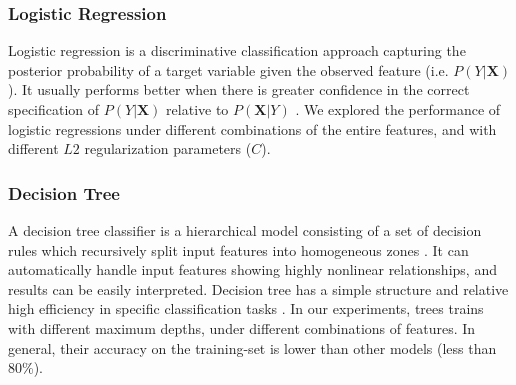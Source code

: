 \documentclass[twoside,twocolumn]{article}
\begin{document}
\subsubsection{Logistic Regression}
Logistic regression is a discriminative classification approach capturing the posterior probability of a target variable given the observed feature (i.e. $P(Y|\boldsymbol{X})$). It usually performs better when there is greater confidence in the correct specification of $P(Y|\boldsymbol{X})$ relative to $P(\boldsymbol{X}|Y)$ \citep{xue2008comment}. We explored the performance of logistic regressions under different combinations of the entire features, and with different $L2$ regularization parameters ($C$). 

 
\subsubsection{Decision Tree}
A decision tree classifier is a hierarchical model consisting of a set of decision rules which recursively split input features into homogeneous zones  \citep{breiman2017classification}. It can automatically handle input features showing highly nonlinear relationships, and results can be easily interpreted.  
Decision tree has a simple structure and relative high efficiency in specific classification tasks \citep{murthy1998automatic, apte2001method}. In our experiments,  trees trains with different maximum depths, under different combinations of features. In general, their accuracy on the training-set is lower than other models (less than 80\%).
\end{document}
